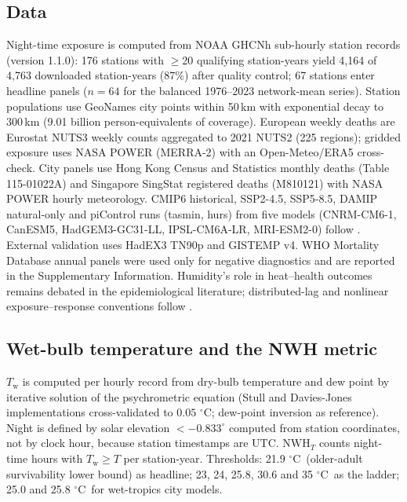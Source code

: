 \documentclass[12pt,a4paper]{article}
\newcommand{\dd}{\ensuremath{\,^{\circ}\mathrm{C}}}
\begin{document}
\subsection*{Data}
Night-time exposure is computed from NOAA GHCNh sub-hourly station records (version 1.1.0):
176 stations with $\geq$20 qualifying station-years yield 4,164 of 4,763 downloaded station-years
(87\%) after quality control; 67 stations enter headline panels ($n=64$ for the balanced
1976--2023 network-mean series). Station populations use GeoNames city points within 50\,km with
exponential decay to 300\,km (9.01 billion person-equivalents of coverage). European weekly deaths
are Eurostat NUTS3 weekly counts aggregated to 2021 NUTS2 (225 regions); gridded exposure uses NASA
POWER (MERRA-2) with an Open-Meteo/ERA5 cross-check. City panels use Hong Kong Census and Statistics
monthly deaths (Table 115-01022A) and Singapore SingStat registered deaths (M810121) with NASA POWER
hourly meteorology. CMIP6 historical, SSP2-4.5, SSP5-8.5, DAMIP natural-only and piControl runs
(tasmin, hurs) from five models (CNRM-CM6-1, CanESM5, HadGEM3-GC31-LL, IPSL-CM6A-LR, MRI-ESM2-0)
follow \citet{Eyring2016}. External validation uses HadEX3 TN90p and GISTEMP v4. WHO Mortality
Database annual panels were used only for negative diagnostics and are reported in the
Supplementary Information. Humidity's role in heat--health outcomes remains debated in the
epidemiological literature\citep{Baldwin2023}; distributed-lag and nonlinear exposure--response
conventions follow \citet{GasparriniDLNM2011}.

\subsection*{Wet-bulb temperature and the NWH metric}
$T_\mathrm{w}$ is computed per hourly record from dry-bulb temperature and dew point by iterative
solution of the psychrometric equation (Stull and Davies-Jones implementations cross-validated to
$0.05\,\dd$; dew-point inversion as reference). Night is defined by solar elevation
$<-0.833^\circ$ computed from station coordinates, not by clock hour, because station timestamps
are UTC. $\mathrm{NWH}_T$ counts night-time hours with $T_\mathrm{w}\geq T$ per station-year.
Thresholds: 21.9\,\dd~(older-adult survivability lower bound\citep{Vanos2023}) as headline; 23, 24,
25.8, 30.6 and 35\,\dd~as the ladder; 25.0 and 25.8\,\dd~for wet-tropics city models.
\end{document}
